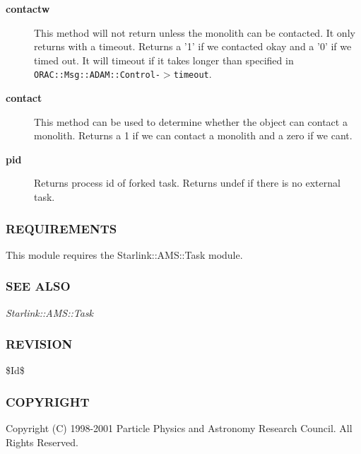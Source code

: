 \begin{description}
\item[{\textbf{contactw}}] \mbox{}

This method will not return unless the monolith can be contacted.
It only returns with a timeout. Returns a '1' if we contacted okay
and a '0' if we timed out. It will timeout if it takes longer than
specified in \texttt{ORAC::Msg::ADAM::Control-$>$timeout}.


\item[{\textbf{contact}}] \mbox{}

This method can be used to determine whether the object can
contact a monolith. Returns a 1 if we can contact a monolith and
a zero if we cant.


\item[{\textbf{pid}}] \mbox{}

Returns process id of forked task.
Returns undef if there is no external task.

\end{description}
\subsubsection*{REQUIREMENTS\label{ORAC::Msg::Task::ADAM_REQUIREMENTS}}


This module requires the Starlink::AMS::Task module.

\subsubsection*{SEE ALSO\label{ORAC::Msg::Task::ADAM_SEE_ALSO}}


\emph{Starlink::AMS::Task}

\subsubsection*{REVISION\label{ORAC::Msg::Task::ADAM_REVISION}}


\$Id\$

\subsubsection*{COPYRIGHT\label{ORAC::Msg::Task::ADAM_COPYRIGHT}}


Copyright (C) 1998-2001 Particle Physics and Astronomy Research
Council. All Rights Reserved.



